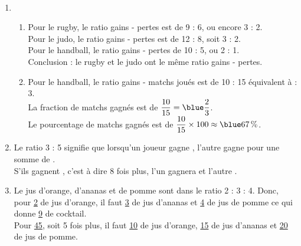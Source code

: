 \ \\ [-5mm]
   \begin{enumerate}
      \item
         \begin{enumerate}
            \item Pour le rugby, le ratio gains - pertes est de 9 : 6, ou encore 3 : 2. \\
               Pour le judo, le ratio gains - pertes est de 12 : 8, soit 3 : 2. \\
               Pour le handball, le ratio gains - pertes de 10 : 5, ou 2 : 1. \\
               Conclusion : {\blue le rugby et le judo ont le même ratio gains - pertes}.
            \item Pour le handball, le ratio gains - matchs joués est de 10 : 15 équivalent à { : 3}. \\ [1mm]
               La fraction de matchs gagnés est de $\dfrac{10}{15} = \blue \dfrac23$. \\ [1.5mm]
               Le pourcentage de matchs gagnés est de $\dfrac{10}{15}\times100 \approx {\blue 67\,\%}$. \smallskip
         \end{enumerate}
      \setcounter{enumi}{1}
      \item Le ratio 3 : 5 signifie que lorsqu'un joueur gagne , l'autre gagne  pour une somme de . \\
         S'ils gagnent , c'est à dire 8 fois plus, {\blue l'un gagnera  et l'autre }. \\
      \item Le jus d'orange, d'ananas et de pomme sont dans le ratio 2 : 3 : 4. Donc, pour \ul{2} de jus d'orange, il faut \ul{3} de jus d'ananas et \ul{4} de jus de pomme ce qui donne \ul{9} de cocktail. \\
         Pour \ul{45}, soit 5 fois plus, il faut {\blue \ul{10} de jus d'orange, \ul{15} de jus d'ananas et \ul{20} de jus de pomme}.
   \end{enumerate}
